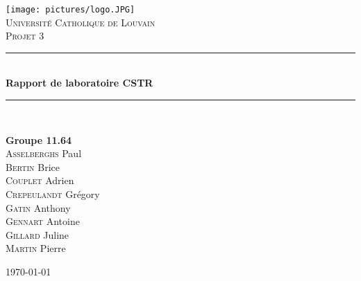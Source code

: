\documentclass[a4paper,11pt, french]{article}
\begin{document}

\newcommand{\HRule}{\rule{\linewidth}{0.5mm}}

\fancyhf{} %
\fancyhead[R]{\thepage} %


\pagestyle{fancy}
\thispagestyle{empty}
\begin{titlepage}
\begin{center}

\texttt{[image: pictures/logo.JPG]}~\\[1cm]

\textsc{\LARGE Université Catholique de Louvain}\\[1.5cm]

\textsc{\Large Projet 3}\\[0.5cm]

\HRule \\[0.4cm]
{ \huge \bfseries Rapport de laboratoire CSTR\\[0.4cm] }

\HRule \\[1.5cm]

\begin{minipage}{0.4\textwidth}
\begin{flushleft} \large
\textbf{Groupe \textsc{11.64}} \\
\textsc{Asselberghs} Paul \\
\textsc{Bertin} Brice \\
\textsc{Couplet} Adrien \\
\textsc{Crepeulandt} Grégory \\
\textsc{Gatin} Anthony \\
\textsc{Gennart} Antoine \\
\textsc{Gillard} Juline \\
\textsc{Martin} Pierre


\end{flushleft}
\end{minipage}
\begin{minipage}{0.4\textwidth}
\begin{flushright} \large
\end{flushright}
\end{minipage}

\setcounter{tocdepth}{2}
\tableofcontents %

\vfill

{\large \today}
\end{center}
\end{titlepage}
\clearpage
{}
\newpage
\end{document}
